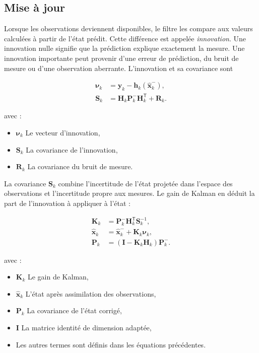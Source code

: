 \subsection{Mise à jour}

Lorsque les observations deviennent disponibles, le filtre les compare aux
valeurs calculées à partir de l'état prédit. Cette différence est appelée
\emph{innovation}. Une innovation nulle signifie que la prédiction explique
exactement la mesure. Une innovation importante peut provenir d'une erreur de
prédiction, du bruit de mesure ou d'une observation aberrante. L'innovation et
sa covariance sont

\begin{align}
\boldsymbol\nu_k
&=
\mathbf y_k-\mathbf h_k(\widehat{\mathbf x}_k^-),
\\
\mathbf S_k
&=
\mathbf H_k\mathbf P_k^-\mathbf H_k^{\mathsf T}+\mathbf R_k.
\label{ann:eq:ekf_innovation}
\end{align}

avec :

\begin{itemize}
    \item $\boldsymbol\nu_k$ Le vecteur d'innovation,
    \item $\mathbf S_k$ La covariance de l'innovation,
    \item $\mathbf R_k$ La covariance du bruit de mesure.
\end{itemize}

La covariance $\mathbf S_k$ combine l'incertitude de l'état projetée dans
l'espace des observations et l'incertitude propre aux mesures. Le gain de
Kalman en déduit la part de l'innovation à appliquer à l'état :

\begin{align}
\mathbf K_k
&=
\mathbf P_k^-\mathbf H_k^{\mathsf T}\mathbf S_k^{-1},
\\
\widehat{\mathbf x}_k
&=
\widehat{\mathbf x}_k^-+\mathbf K_k\boldsymbol\nu_k,
\\
\mathbf P_k
&=
\left(\mathbf I-\mathbf K_k\mathbf H_k\right)\mathbf P_k^-.
\label{ann:eq:ekf_update}
\end{align}

avec :

\begin{itemize}
    \item $\mathbf K_k$ Le gain de Kalman,
    \item $\widehat{\mathbf x}_k$ L'état après assimilation des observations,
    \item $\mathbf P_k$ La covariance de l'état corrigé,
    \item $\mathbf I$ La matrice identité de dimension adaptée,
    \item Les autres termes sont définis dans les équations précédentes.
\end{itemize}

